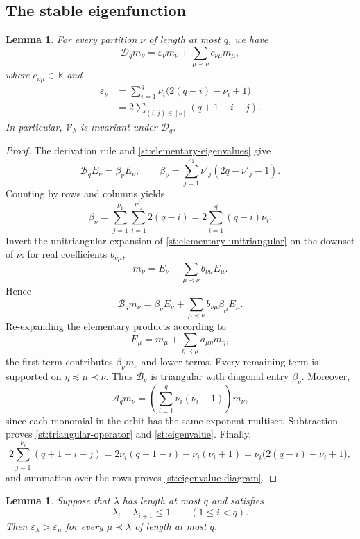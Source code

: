 \documentclass[reqno, 12pt]{article}
\numberwithin{equation}{section}
\newtheorem{lemma}[theorem]{Lemma}
\theoremstyle{definition}
\newcommand{\RR}{\mathbb R}
\begin{document}
\subsection{The stable eigenfunction}

\begin{lemma}\label{st:operator-triangular}
For every partition $\nu$ of length at most $q$, we have 
\begin{equation}\label{st:triangular-operator}
\mathcal D_q m_\nu=\varepsilon_\nu m_\nu+\sum_{\mu\prec\nu}c_{\nu\mu}m_\mu,
\end{equation}
where $c_{\nu\mu}\in\RR$ and
\begin{align}
\varepsilon_\nu&=\sum_{i=1}^q\nu_i\bigl(2(q-i)-\nu_i+1\bigr)\label{st:eigenvalue}\\
&=2\sum_{(i,j)\in[\nu]}(q+1-i-j).\label{st:eigenvalue-diagram}
\end{align}
In particular, $\mathcal V_\lambda$ is invariant under $\mathcal D_q$.
\end{lemma}
\begin{proof}
The derivation rule and \cref{st:elementary-eigenvalues} give
\[
\mathcal B_qE_\nu
=\beta_\nu E_\nu,
\qquad
\beta_\nu=\sum_{j=1}^{\nu_1}\nu'_j(2q-\nu'_j-1).
\]
Counting by rows and columns yields
\begin{equation}\label{st:beta-row-column}
\beta_\nu
=\sum_{j=1}^{\nu_1}\sum_{i=1}^{\nu'_j}2(q-i)
=2\sum_{i=1}^q(q-i)\nu_i.
\end{equation}
Invert the unitriangular expansion of \cref{st:elementary-unitriangular} on the downset of $\nu$:
for real coefficients $b_{\nu\mu}$,
\[
m_\nu=E_\nu+\sum_{\mu\prec\nu}b_{\nu\mu}E_\mu.
\]
Hence
\[
\mathcal B_qm_\nu
=\beta_\nu E_\nu+
 \sum_{\mu\prec\nu}b_{\nu\mu}\beta_\mu E_\mu.
\]
Re-expanding the elementary products according to
$$E_\mu=m_\mu+\sum_{\eta\prec\mu}a_{\mu\eta}m_\eta,$$
the first term contributes $\beta_\nu m_\nu$ and lower terms.  Every remaining term is
supported on $\eta\preceq\mu\prec\nu$.  Thus
$\mathcal B_q$ is triangular with diagonal entry $\beta_\nu$.
Moreover,
\[\mathcal A_qm_\nu
=\left(\sum_{i=1}^q\nu_i(\nu_i-1)\right)m_\nu,
\]
since each monomial in the orbit has the same exponent multiset.  Subtraction proves \eqref{st:triangular-operator}
and \eqref{st:eigenvalue}.  Finally,
\[
2\sum_{j=1}^{\nu_i}(q+1-i-j)
=2\nu_i(q+1-i)-\nu_i(\nu_i+1)
=\nu_i\bigl(2(q-i)-\nu_i+1\bigr),
\]
and summation over the rows proves
\eqref{st:eigenvalue-diagram}.
\end{proof}

\begin{lemma}\label{st:spectral-gap}
Suppose that $\lambda$ has length at most $q$ and satisfies
\begin{equation}\label{st:adjacent-drop}
\lambda_i-\lambda_{i+1}\leq1\qquad(1\leq i<q).
\end{equation}
Then $\varepsilon_\lambda>\varepsilon_\mu$ for every
$\mu\prec\lambda$ of length at most $q$.
\end{lemma}
\end{document}
